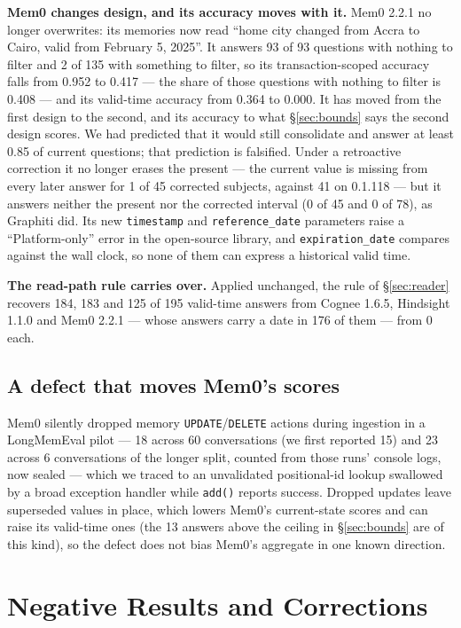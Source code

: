 \documentclass[conference]{IEEEtran}
\begin{document}
\textbf{Mem0 changes design, and its accuracy moves with it.} Mem0 2.2.1 no
longer overwrites: its memories now read ``home city changed from Accra to
Cairo, valid from February 5, 2025''. It answers 93 of 93 questions with
nothing to filter and 2 of 135 with something to filter, so its
transaction-scoped accuracy falls from 0.952 to 0.417 --- the share of those
questions with nothing to filter is 0.408 --- and its valid-time accuracy from
0.364 to 0.000. It has moved from the first design to the second, and its
accuracy to what \S\ref{sec:bounds} says the second design scores. We had
predicted that it would still consolidate and answer at least 0.85 of current
questions; that prediction is falsified. Under a retroactive correction it no
longer erases the present --- the current value is missing from every later
answer for 1 of 45 corrected subjects, against 41 on 0.1.118 --- but it answers
neither the present nor the corrected interval (0 of 45 and 0 of 78), as
Graphiti did. Its new \texttt{timestamp} and \texttt{reference\_date}
parameters raise a ``Platform-only'' error in the open-source library, and
\texttt{expiration\_date} compares against the wall clock, so none of them can
express a historical valid time.

\textbf{The read-path rule carries over.} Applied unchanged, the rule of
\S\ref{sec:reader} recovers 184, 183 and 125 of 195 valid-time answers from
Cognee 1.6.5, Hindsight 1.1.0 and Mem0 2.2.1 --- whose answers carry a date in
176 of them --- from 0 each.

\subsection{A defect that moves Mem0's scores}\label{sec:external}

Mem0 silently dropped memory \texttt{UPDATE}/\texttt{DELETE} actions
during ingestion in a LongMemEval pilot --- 18 across 60 conversations (we first
reported 15) and 23 across 6 conversations of the longer split, counted from
those runs' console logs, now sealed --- which we traced to an unvalidated
positional-id lookup swallowed by a broad exception handler while
\texttt{add()} reports success. Dropped updates leave superseded values in
place, which lowers Mem0's current-state scores and can raise its valid-time
ones (the 13 answers above the ceiling in \S\ref{sec:bounds} are of this kind),
so the defect does not bias Mem0's aggregate in one known direction.

\section{Negative Results and Corrections}\label{sec:negative}
\end{document}
